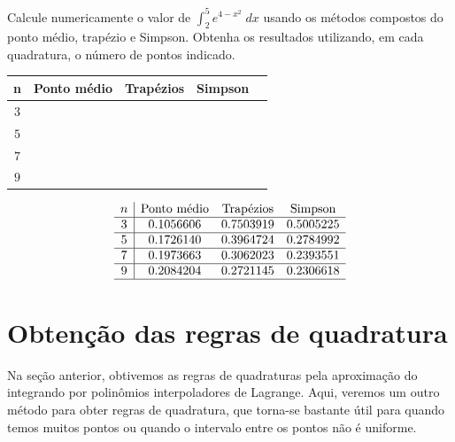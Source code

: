 \begin{exer}
Calcule numericamente o valor de $\int_2^5e^{4-x^2}\;dx$ usando os métodos compostos do ponto médio, trapézio e Simpson. Obtenha os resultados utilizando, em cada quadratura, o número de pontos indicado.
\begin{center}
\begin{tabular}{|c|c|c|c|c|}
\hline
n   & Ponto médio & Trapézios & Simpson \\
\hline
$3$ &~\hspace{40pt}~& ~\hspace{40pt}~& ~\hspace{40pt}\\
\hline
$5 $ & & & \\
\hline
$7 $ & & &\\
\hline
$9$  & & &\\
\hline
\end{tabular}
\end{center}
\end{exer}
\begin{resp}
  
    \begin{equation*}
    \begin{array}{c|cccc}
        n   & \text{Ponto médio} & \text{Trapézios} & \text{Simpson} \\  \hline
        3 & 0.1056606  &  0.7503919  &  0.5005225  \\  \hline
        5 & 0.1726140 &   0.3964724  &  0.2784992   \\\hline
        7 & 0.1973663 &   0.3062023  &  0.2393551  \\ \hline
        9  &  0.2084204 &   0.2721145  &  0.2306618  \\ \hline
    \end{array}      
    \end{equation*}
  
\end{resp}



\section{Obtenção das regras de quadratura}

Na seção anterior, obtivemos as regras de quadraturas pela aproximação do integrando por polinômios interpoladores de Lagrange. Aqui, veremos um outro método para obter regras de quadratura, que torna-se bastante útil para quando temos muitos pontos ou quando o intervalo entre os pontos não é uniforme.

